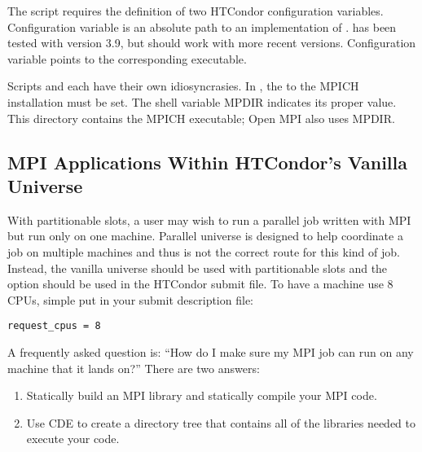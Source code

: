The  script requires the definition of
two HTCondor configuration variables.
Configuration variable  is an absolute path to
an implementation of .
 has been tested with  version 3.9,
but should work with more recent versions.
Configuration variable  points
to the corresponding  executable.

Scripts  and 
each have their own idiosyncrasies.
In , the  to the MPICH installation must be set.
The shell variable MPDIR indicates its proper value.
This directory contains the MPICH  executable; Open MPI also
uses MPDIR.


\subsection{\label{sec:parallel-mpi-submit-single}MPI Applications Within HTCondor's Vanilla Universe}

With partitionable slots, a user may wish to run a parallel job written with
MPI but run only on one machine. Parallel universe is designed to help 
coordinate a job on multiple machines and thus is not the correct route for
this kind of job. Instead, the vanilla universe should be used with partitionable
slots and the  option should be used in the HTCondor submit
file. To have a machine use 8 CPUs, simple put in your submit description file:

\begin{verbatim}
request_cpus = 8
\end{verbatim}

A frequently asked question is: ``How do I make sure my MPI job can run 
on any machine that it lands on?'' There are two answers:
\begin{enumerate}
\item Statically build an MPI library and statically compile your MPI code.
\item Use CDE to create a directory tree that contains all of the libraries 
needed to execute your code.
\end{enumerate}

